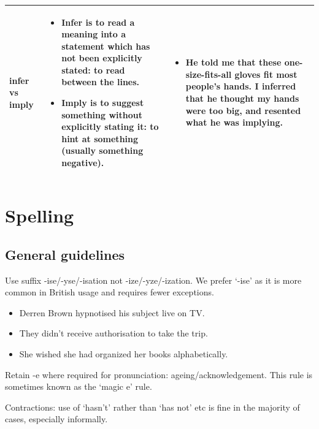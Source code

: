 \documentclass[11pt,a4paper]{book}
\newcommand{\xmark}{{\color{cadmiumred}\ding{54}}}%
\newcommand{\cmark}{{\color{green(html/cssgreen)}\checkmark}}%
\begin{document}
{\begin{longtable}{p{1.5cm} | p{4.75cm} | p{4.75cm}}
		 		
		 		\noindent 
		 		\mbox{infer} vs \mbox{imply}
		 		&
		 		\begin{itemize}[noitemsep,leftmargin=*,topsep=0pt,partopsep=0pt]
		 			\item Infer is to read a meaning into a statement which has not been explicitly stated: to read between the lines.
		 			\item Imply is to suggest something without explicitly stating it: to hint at something (usually something negative).
		 		\end{itemize}  & 
		 		\begin{itemize}[noitemsep,leftmargin=*,topsep=0pt,partopsep=0pt]
		 			\item 
		 			He told me that these one-size-fits-all gloves fit most people's hands. I inferred that he thought my hands were too big, and resented what he was implying.
		 		\end{itemize} \\
	 		\bottomrule
			\end{longtable}
			}
		\newpage
			\section{Spelling}
			\subsection{General guidelines}
			Use suffix -ise/-yse/-isation not -ize/-yze/-ization. We prefer `-ise' as it is more common in British usage and requires fewer exceptions.
			{\firasans \begin{mdframed}[backgroundcolor=aliceblue] \begin{itemize}[label=\cmark]
				\item Derren Brown hypnotised his subject live on TV.
				\item They didn't receive authorisation to take the trip.
				\item[\xmark] She wished she had organized her books alphabetically.
			\end{itemize} \end{mdframed} }
			Retain -e where required for pronunciation: ageing/acknowledgement. This rule is sometimes known as the `magic e' rule.\par
			Contractions: use of `hasn't' rather than `has not' etc is fine in the majority of cases, especially informally.
\end{document}
